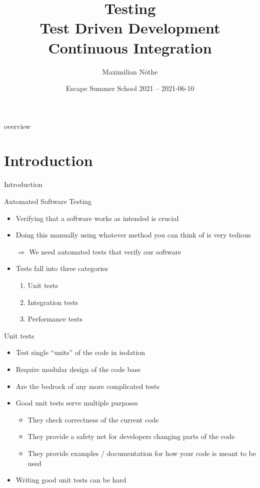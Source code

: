 \documentclass[
  aspectratio=1610,
]{beamer}
\author[M. Nöthe]{Maximilian Nöthe}
\title[Testing]{Testing \\ Test Driven Development \\ Continuous Integration}
\date[2021-03-10]{Escape Summer School 2021 – 2021-06-10}
\institute[TU Dortmund]{Astroparticle Physics, TU Dortmund}
\newcommand\headlineframe[1]{%
  \begin{frame}[c]%
    \begin{center}%
      \Huge\color{vertexDarkRed}#1%
    \end{center}%
  \end{frame}%
}%
\begin{document}
\maketitle

\begin{frame}[c]{overview}
  \tableofcontents
\end{frame}

\section{Introduction}
\headlineframe{Introduction}

\begin{frame}[c]{Automated Software Testing}
  \begin{itemize}
    \item Verifying that a software works as intended is crucial
    \item Doing this manually using whatever method you can think of is very tedious
    \item[$\Rightarrow$] We need automated tests that verify our software
    \item Tests fall into three categories
      \begin{enumerate}
        \item Unit tests
        \item Integration tests
        \item Performance tests
      \end{enumerate}
  \end{itemize}
\end{frame}

\begin{frame}[c]{Unit tests}
  \begin{itemize}
    \item Test single \enquote{units} of the code in isolation
    \item Require modular design of the code base
    \item Are the bedrock of any more complicated tests
    \item Good unit tests serve multiple purposes
      \begin{itemize}
        \item They check correctness of the current code
        \item They provide a safety net for developers changing parts of the code
        \item They provide examples / documentation for how your code is meant to be used
      \end{itemize}
    \item Writing good unit tests can be hard
  \end{itemize}
\end{frame}
\end{document}
